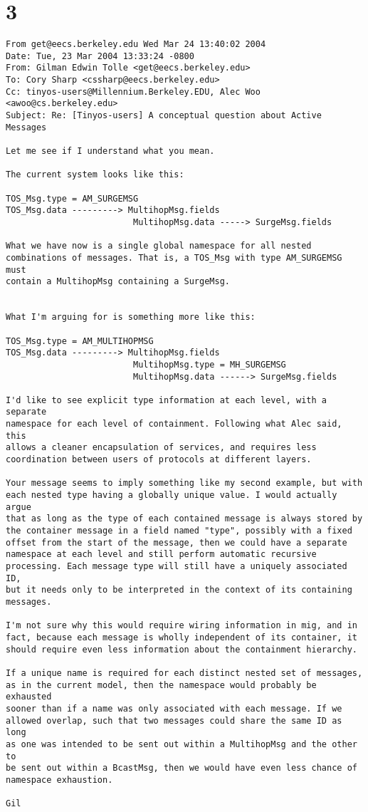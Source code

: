 \documentclass[10pt]{article}
\begin{document}
\section*{3}

\begin{verbatim}
From get@eecs.berkeley.edu Wed Mar 24 13:40:02 2004
Date: Tue, 23 Mar 2004 13:33:24 -0800
From: Gilman Edwin Tolle <get@eecs.berkeley.edu>
To: Cory Sharp <cssharp@eecs.berkeley.edu>
Cc: tinyos-users@Millennium.Berkeley.EDU, Alec Woo <awoo@cs.berkeley.edu>
Subject: Re: [Tinyos-users] A conceptual question about Active Messages

Let me see if I understand what you mean.

The current system looks like this:

TOS_Msg.type = AM_SURGEMSG
TOS_Msg.data ---------> MultihopMsg.fields
                         MultihopMsg.data -----> SurgeMsg.fields

What we have now is a single global namespace for all nested 
combinations of messages. That is, a TOS_Msg with type AM_SURGEMSG must 
contain a MultihopMsg containing a SurgeMsg.


What I'm arguing for is something more like this:

TOS_Msg.type = AM_MULTIHOPMSG
TOS_Msg.data ---------> MultihopMsg.fields
                         MultihopMsg.type = MH_SURGEMSG
                         MultihopMsg.data ------> SurgeMsg.fields

I'd like to see explicit type information at each level, with a separate 
namespace for each level of containment. Following what Alec said, this 
allows a cleaner encapsulation of services, and requires less 
coordination between users of protocols at different layers.

Your message seems to imply something like my second example, but with 
each nested type having a globally unique value. I would actually argue 
that as long as the type of each contained message is always stored by 
the container message in a field named "type", possibly with a fixed 
offset from the start of the message, then we could have a separate 
namespace at each level and still perform automatic recursive 
processing. Each message type will still have a uniquely associated ID, 
but it needs only to be interpreted in the context of its containing 
messages.

I'm not sure why this would require wiring information in mig, and in 
fact, because each message is wholly independent of its container, it 
should require even less information about the containment hierarchy.

If a unique name is required for each distinct nested set of messages, 
as in the current model, then the namespace would probably be exhausted 
sooner than if a name was only associated with each message. If we 
allowed overlap, such that two messages could share the same ID as long 
as one was intended to be sent out within a MultihopMsg and the other to 
be sent out within a BcastMsg, then we would have even less chance of 
namespace exhaustion.

Gil

\end{verbatim}
\end{document}
